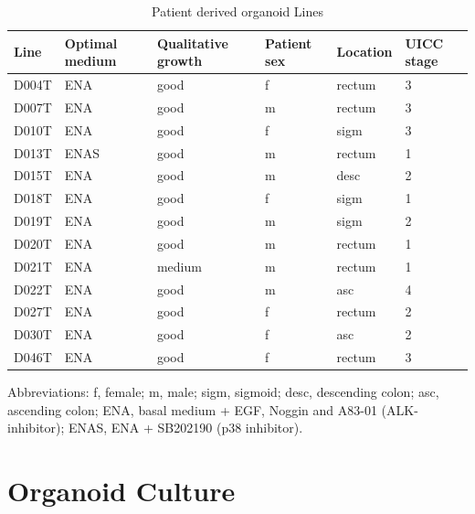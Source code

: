 \begin{flushleft}
\begin{table}[htbp]
\caption{Patient derived organoid Lines}
\label{tab:patient_organoid}
\begin{tabularx}{\textwidth}{lXXXXX}
\toprule
\textbf{Line} & \textbf{Optimal medium} & \textbf{Qualitative growth} & \textbf{Patient sex} & \textbf{Location} & \textbf{UICC stage} \\
\midrule
D004T & ENA & good & f & rectum & 3 \\
D007T & ENA & good & m & rectum & 3 \\
D010T & ENA & good & f & sigm & 3 \\
D013T & ENAS & good & m & rectum & 1 \\
D015T & ENA & good & m & desc & 2 \\
D018T & ENA & good & f & sigm & 1 \\
D019T & ENA & good & m & sigm & 2 \\
D020T & ENA & good & m & rectum & 1 \\
D021T & ENA & medium & m & rectum & 1 \\
D022T & ENA & good & m & asc & 4 \\
D027T & ENA & good & f & rectum & 2 \\
D030T & ENA & good & f & asc & 2 \\
D046T & ENA & good & f & rectum & 3 \\
\bottomrule
\end{tabularx}
\end{table}

Abbreviations: f, female; m, male; sigm, sigmoid; desc, descending colon; asc, ascending colon; ENA, basal medium + EGF, Noggin and A83-01 (ALK-inhibitor); ENAS, ENA + SB202190 (p38 inhibitor).

\section{Organoid Culture}


\end{flushleft}
